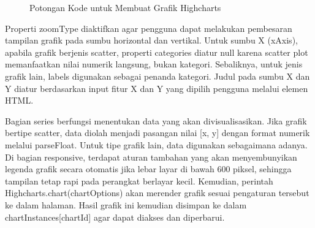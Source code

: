 \begin{enumerate}
\begin{figure}[H]
	\caption{Potongan Kode untuk Membuat Grafik Highcharts}
	\label{Potongan Kode untuk Membuat Grafik Highcharts}
\end{figure}

Properti zoomType diaktifkan agar pengguna dapat melakukan pembesaran tampilan grafik pada sumbu horizontal dan vertikal. Untuk sumbu X (xAxis), apabila grafik berjenis scatter, properti categories diatur null karena scatter plot memanfaatkan nilai numerik langsung, bukan kategori. Sebaliknya, untuk jenis grafik lain, labels digunakan sebagai penanda kategori. Judul pada sumbu X dan Y diatur berdasarkan input fitur X dan Y yang dipilih pengguna melalui elemen HTML.

Bagian series berfungsi menentukan data yang akan divisualisasikan. Jika grafik bertipe scatter, data diolah menjadi pasangan nilai [x, y] dengan format numerik melalui parseFloat. Untuk tipe grafik lain, data digunakan sebagaimana adanya. Di bagian responsive, terdapat aturan tambahan yang akan menyembunyikan legenda grafik secara otomatis jika lebar layar di bawah 600 piksel, sehingga tampilan tetap rapi pada perangkat berlayar kecil. Kemudian, perintah Highcharts.chart(chartOptions) akan merender grafik sesuai pengaturan tersebut ke dalam halaman. Hasil grafik ini kemudian disimpan ke dalam chartInstances[chartId] agar dapat diakses dan diperbarui. 


\end{enumerate}
